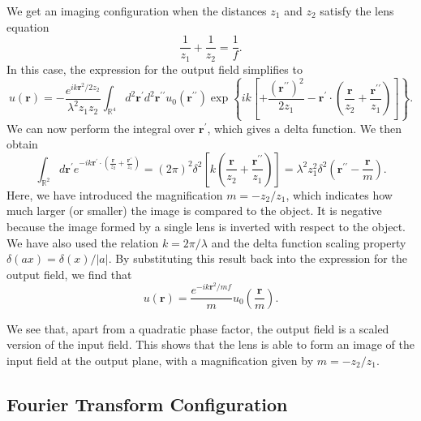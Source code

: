 \documentclass[a4paper,10pt]{article}
\begin{document}
We get an imaging configuration when the distances $z_1$ and $z_2$ satisfy the lens equation
\begin{equation}
    \frac{1}{z_1} + \frac{1}{z_2} = \frac{1}{f}.
\end{equation}
In this case, the expression for the output field simplifies to
\begin{equation}
    u(\mathbf{r}) = -\frac{e^{i k \mathbf{r}^2 / 2 z_2}}{\lambda^2 z_1 z_2}  \int_{\mathbb{R}^4} d^2\mathbf{r}^\prime d^2\mathbf{r}^{\prime \prime} u_0(\mathbf{r}^{\prime \prime}) \exp\left\{ ik \left[  +\frac{(\mathbf{r}^{\prime \prime})^2}{2z_1} - \mathbf{r}^\prime \cdot \left( \frac{\mathbf{r}}{z_2} + \frac{\mathbf{r}^{\prime \prime}}{z_1} \right) \right] \right\}.
\end{equation}
We can now perform the integral over $\mathbf{r}^\prime$, which gives a delta function. We then obtain
\begin{equation}
    \int_{\mathbb{R}^2} d\mathbf{r}^\prime e^{-ik \mathbf{r}^\prime \cdot \left( \frac{\mathbf{r}}{z_2} + \frac{\mathbf{r}^{\prime \prime}}{z_1} \right)} = (2 \pi)^2 \delta^2 \left[ k \left( \frac{\mathbf{r}}{z_2} + \frac{\mathbf{r}^{\prime \prime}}{z_1} \right) \right] = \lambda^2z_1^2 \delta^2\left( \mathbf{r}^{\prime \prime} - \frac{\mathbf{r}}{m}  \right).
\end{equation}
Here, we have introduced the magnification $m = -z_2 / z_1$, which indicates how much larger (or smaller) the image is compared to the object. It is negative because the image formed by a single lens is inverted with respect to the object. We have also used the relation $k = 2 \pi / \lambda$ and the delta function scaling property $\delta(a x) = \delta(x) / |a|$. By substituting this result back into the expression for the output field, we find that
\begin{equation}
    u(\mathbf{r}) = \frac{e^{-ik\mathbf{r}^2/mf}}{m} u_0\left(\frac{\mathbf{r}}{m}\right).
\end{equation}

We see that, apart from a quadratic phase factor, the output field is a scaled version of the input field. This shows that the lens is able to form an image of the input field at the output plane, with a magnification given by $m = -z_2 / z_1$.

\subsection{Fourier Transform Configuration}
\end{document}
